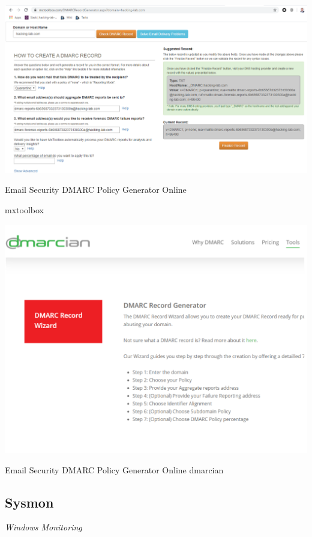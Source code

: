 \begin{table}[h]
  \centering
  \includegraphics[width=\textwidth]{resources/12-email-security-dmarc-4.png}
  \caption{Email Security DMARC Policy Generator Online} mxtoolbox
\end{table}

\begin{table}[h]
  \centering
  \includegraphics[width=\textwidth]{resources/12-email-security-dmarc-5.png}
  \caption{Email Security DMARC Policy Generator Online dmarcian}
\end{table}

\subsection{Sysmon}
\textit{Windows Monitoring}

